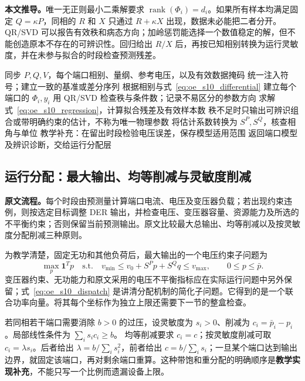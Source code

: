 \documentclass[UTF8,11pt,fontset=fandol,openany,oneside]{ctexbook}
\DeclareMathOperator{\rank}{rank}
\theoremstyle{definition}
\theoremstyle{remark}
\numberwithin{equation}{chapter}
\begin{document}
\textbf{本文推导。}唯一无正则最小二乘解要求
$\rank(\Phi_i)=d_i$。如果所有样本均满足固定 $Q=\kappa P$，同相的 $R$ 和 $X$ 只通过 $R+\kappa X$ 出现，数据未必能把二者分开。QR/SVD 可以报告有效秩和病态方向；加岭惩罚能选择一个数值稳定的解，但不能创造原本不存在的可辨识性。回归给出 $R/X$ 后，再按已知相别转换为运行灵敏度，并在未参与拟合的时段检查预测残差。

\begin{algorithm}[tbp]
\caption{S10 的辨识链：原模型顺序与教学数值诊断}
\label{alg:oe_s10_identify}
\begin{algorithmic}[1]
\Require 同步 $P,Q,V$，每个端口相别、量纲、参考电压，以及有效数据掩码
\State 统一注入符号；建立一致的基准或差分序列
\State 根据相别与式~\eqref{eq:oe_s10_differential} 建立每个端口的 $\Phi_i,y_i$
 \State 用 QR/SVD 检查秩与条件数；记录不易区分的参数方向
 \State 求解式~\eqref{eq:oe_s10_regression}，计算拟合残差及有效样本数
 \State 秩不足时只输出可辨识组合或带明确约束的估计，不称为唯一物理参数
\EndFor
\State 将估计系数转换为 $S^P,S^Q$，核查相角与单位
\State 教学补充：在留出时段检验电压误差，保存模型适用范围
\State 返回端口模型及辨识诊断，交给运行分配层
\end{algorithmic}
\end{algorithm}

\subsection{运行分配：最大输出、均等削减与灵敏度削减}

\textbf{原文流程。}每个时段由预测量计算端口电流、电压及变压器负载；若出现约束违例，则按选定目标调整 DER 输出，并检查电压、变压器容量、资源能力及所选的不平衡约束；否则保留当前预测输出。原文比较最大总输出、均等削减以及按灵敏度分配削减三种原则。

为教学清楚，固定无功和其他负荷后，最大输出的一个电压约束子问题为
\begin{equation}
 \max_p\boldsymbol1^Tp\quad\text{s.t.}\quad
 v_{\min}\le v_0+S^Pp+S^Qq\le v_{\max},\qquad
 0\le p\le\bar p.
 \label{eq:oe_s10_dispatch}
\end{equation}
变压器约束、无功能力和原文采用的电压不平衡指标应在实际运行问题中另外保留；式~\eqref{eq:oe_s10_dispatch} 是讲清分配机制的简化子问题。它得到的是一个联合功率向量。将其每个坐标作为独立上限还需要下一节的整盒检查。

若同相若干端口需要消除 $b>0$ 的过压，设灵敏度为 $s_i>0$、削减为
$c_i=\bar p_i-p_i$。局部线性条件为 $\sum_i s_ic_i\ge b$。
均等削减要求 $c_i=c$；按灵敏度削减可取 $c_i=\lambda s_i$。后者给出
$\lambda=b/\sum_is_i^2$，前者给出 $c=b/\sum_is_i$；一旦某个端口达到输出边界，就固定该端口，再对剩余端口重算。这种带饱和重分配的明确顺序是\textbf{教学实现补充}，不能只写一个比例而遗漏设备上限。
\end{document}
